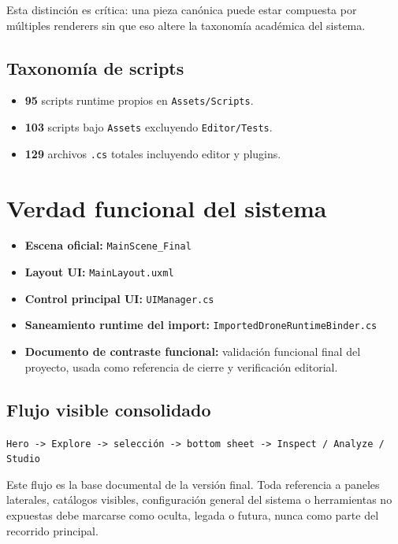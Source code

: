 \documentclass[12pt,letterpaper]{article}
\begin{document}
\noindent Esta distinción es crítica: una pieza canónica puede estar compuesta por múltiples renderers sin que eso altere la taxonomía académica del sistema.

\subsection{Taxonomía de scripts}
\begin{itemize}
    \item \textbf{95} scripts runtime propios en \texttt{Assets/Scripts}.
    \item \textbf{103} scripts bajo \texttt{Assets} excluyendo \texttt{Editor/Tests}.
    \item \textbf{129} archivos \texttt{.cs} totales incluyendo editor y plugins.
\end{itemize}

\section{Verdad funcional del sistema}

\begin{itemize}
    \item \textbf{Escena oficial:} \texttt{MainScene\_Final}
    \item \textbf{Layout UI:} \texttt{MainLayout.uxml}
    \item \textbf{Control principal UI:} \texttt{UIManager.cs}
    \item \textbf{Saneamiento runtime del import:} \texttt{ImportedDroneRuntimeBinder.cs}
    \item \textbf{Documento de contraste funcional:} validación funcional final del proyecto, usada como referencia de cierre y verificación editorial.
\end{itemize}

\subsection{Flujo visible consolidado}
\begin{center}
\texttt{Hero -> Explore -> selección -> bottom sheet -> Inspect / Analyze / Studio}
\end{center}

\noindent Este flujo es la base documental de la versión final. Toda referencia a paneles laterales, catálogos visibles, configuración general del sistema o herramientas no expuestas debe marcarse como oculta, legada o futura, nunca como parte del recorrido principal.
\end{document}
